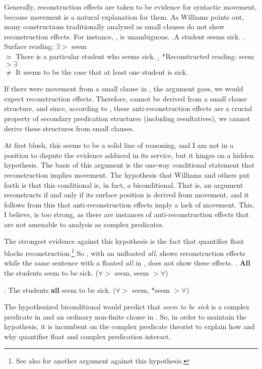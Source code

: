 Generally, reconstruction effects are taken to be evidence for syntactic movement, because movement is a natural explanation for them.
As Williams points out, many constructions traditionally analyzed as small clauses do not show reconstruction effects.
For instance, \Next, is unambiguous.
\ex.A student seems sick.
\a. Surface reading: $\exists >$ seem\\
$\approx$ There is a particular student who seems sick.
\b. *Reconstructed reading: seem $> \exists$\\
$\neq$ It seems to be the case that at least one student is sick.

If there were movement from a small clause in \Last, the argument goes, we would expect reconstruction effects.
Therefore, \Last cannot be derived from a small clause structure, and since, according to \textcite{irimia2012secondary}, these anti-reconstruction effects are a crucial property of secondary predication structures (including resultatives), we cannot derive these structures from small clauses.

At first blush, this seems to be a solid line of reasoning, and I am not in a position to dispute the evidence adduced in its service, but it hinges on a hidden hypothesis.
The basis of this argument is the one-way conditional statement that reconstruction implies movement.
The hypothesis that Williams and others put forth is that this conditional is, in fact, a biconditional.
That is, an argument reconstructs if and only if its surface position is derived from movement, and it follows from this that anti-reconstruction effects imply a lack of movement.
This, I believe, is too strong, as there are instances of anti-reconstruction effects that are not amenable to analysis as complex predicates.

The strongest evidence against this hypothesis is the fact that quantifier float blocks reconstruction.\footnote{See also \textcite{bobaljik2004anti} for another argument against this hypothesis.}
So \Next, with an unfloated \textit{all}, shows reconstruction effects while the same sentence with a floated \textit{all} in \NNext, does not show these effects.
\ex. \textbf{All} the students seem to be sick. ($\forall >$ seem, seem $> \forall$)

\ex. The students \textbf{all} seem to be sick. ($\forall >$ seem, *seem $> \forall$)

The hypothesized biconditional would predict that \textit{seem to be sick} is a complex predicate in \Last and an ordinary non-finite clause in \LLast.
So, in order to maintain the hypothesis, it is incumbent on the complex predicate theorist to explain how and why quantifier float and complex predication interact.


